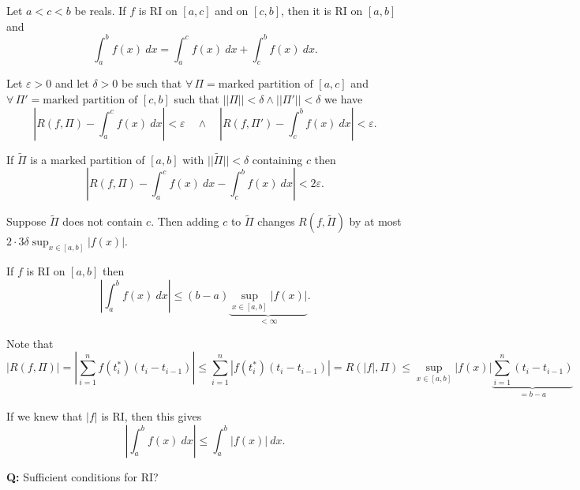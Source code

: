 \documentclass{notes}
\begin{document}
  \begin{lem}[Additivity]
    Let $a < c < b$ be reals.
    If $f$ is RI on $[a, c]$ and on $[c, b]$, then it is RI on $[a, b]$ and 
    \[
      \int_a^b f(x)\ dx = \int_a^c f(x)\ dx + \int_c^b f(x)\ dx.
    \]
  \end{lem}
  
  \begin{prf}
    Let $\varepsilon > 0$ and let $\delta > 0$ be such that $\forall \, \Pi = \text{marked partition of $[a, c]$}$ and \\ $\forall \, \Pi' = \text{marked partition of $[c, b]$}$ such that $||\Pi|| < \delta \land ||\Pi'|| < \delta$ we have 
    \[
      \left | R(f, \Pi) - \int_a^c f(x)\ dx \right | < \varepsilon \quad \land \quad \left | R(f, \Pi') - \int_c^b f(x)\ dx \right | < \varepsilon.
    \]
    
    If $\tilde \Pi$ is a marked partition of $[a, b]$ with $||\tilde \Pi|| < \delta$ containing $c$ then 
    \[
      \left | R(f, \Pi) - \int_a^c f(x)\ dx - \int_c^b f(x)\ dx \right | < 2 \varepsilon.
    \]
    
    Suppose $\tilde \Pi$ does not contain $c$.
    Then adding $c$ to $\tilde \Pi$ changes $R(f, \tilde \Pi)$ by at most $2 \cdot 3 \delta \sup_{x \in [a, b]} \left | f(x) \right |$.
  \end{prf}
  
  \begin{lem}
    If $f$ is RI on $[a, b]$ then 
    \[
      \left | \int_a^b f(x)\ dx \right | \leq (b - a) \underbrace{\sup_{x \in [a, b]} \left | f(x) \right |}_{{} < \infty}.
    \]
  \end{lem}
  
  \begin{prf}
    Note that 
    \[
      \left | R(f, \Pi) \right | = \left | \sum_{i = 1}^n f(t^*_i) (t_i - t_{i - 1}) \right | \leq \sum_{i = 1}^n \left | f(t^*_i) (t_i - t_{i - 1}) \right | = R(\left | f \right |, \Pi) \leq \sup_{x \in [a, b]} \left | f(x) \right | \underbrace{\sum_{i = 1}^n (t_i - t_{i - 1})}_{{} = b - a}
    \]
  \end{prf}
  
  \begin{note}
    If we knew that $\left | f \right |$ is RI, then this gives 
    \[
      \left | \int_a^b f(x)\ dx \right | \leq \int_a^b \left | f(x) \right |\ dx.
    \]
  \end{note}
  
  {\boldmath \bfseries Q:} Sufficient conditions for RI?
  
\end{document}
